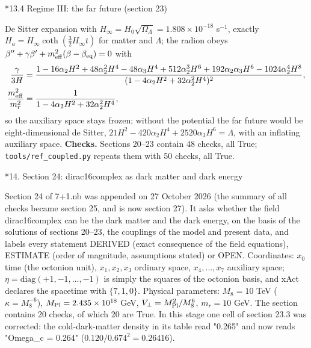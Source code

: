 \documentclass[10pt,a4paper]{article}
\makeatletter
\renewcommand\section{\@startsection{section}{1}{\z@}{-3.5ex \@plus -1ex \@minus -.2ex}{2.3ex \@plus.2ex}{\normalfont\Large\bfseries\raggedright}}
\renewcommand\subsection{\@startsection{subsection}{2}{\z@}{-3.25ex\@plus -1ex \@minus -.2ex}{1.5ex \@plus .2ex}{\normalfont\large\bfseries\raggedright}}
\makeatother
\begin{document}
\subsection*{13.4 Regime III: the far future (section 23)}
De Sitter expansion with $H_\infty=H_0\sqrt{\Omega_\Lambda}=1.808\times10^{-18}$ s$^{-1}$, exactly $H_a=H_\infty\coth(\tfrac32H_\infty t)$ for matter and $\Lambda$; the radion obeys $\beta''+\gamma\beta'+m_{\rm eff}^2(\beta-\beta_{\rm eq})=0$ with
\begin{align*}
\frac{\gamma}{3H}&=\frac{1-16\alpha_2H^2+48\alpha_2^2H^4-48\alpha_3H^4+512\alpha_2^3H^6+192\alpha_2\alpha_3H^6-1024\alpha_2^4H^8}{(1-4\alpha_2H^2+32\alpha_2^2H^4)^2}, \\
\frac{m_{\rm eff}^2}{m_r^2}&=\frac1{1-4\alpha_2H^2+32\alpha_2^2H^4},
\end{align*}
so the auxiliary space stays frozen; without the potential the far future would be eight-dimensional de Sitter, $21H^2-420\alpha_2H^4+2520\alpha_3H^6=\Lambda$, with an inflating auxiliary space. \textbf{Checks.} Sections 20–23 contain 48 checks, all True; \texttt{tools/\allowbreak{}ref\_\allowbreak{}coupled.py} repeats them with 50 checks, all True.

\section*{14. Section 24: dirac16complex as dark matter and dark energy}
Section 24 of 7+1.nb was appended on 27 October 2026 (the summary of all checks became section 25, and is now section 27). It asks whether the field dirac16complex can be the dark matter and the dark energy, on the basis of the solutions of sections 20–23, the couplings of the model and present data, and labels every statement DERIVED (exact consequence of the field equations), ESTIMATE (order of magnitude, assumptions stated) or OPEN. Coordinates: $x_0$ time (the octonion unit), $x_1,x_2,x_3$ ordinary space, $x_4,\dots,x_7$ auxiliary space; $\eta=\mathrm{diag}(+1,-1,\dots,-1)$ is simply the squares of the octonion basis, and xAct declares the spacetime with $\{7,1,0\}$. Physical parameters: $M_8=10$ TeV ($\kappa=M_8^{-6}$), $M_{\rm Pl}=2.435\times10^{18}$ GeV, $V_\perp=M_{\rm Pl}^2/M_8^6$, $m_r=10$ GeV. The section contains 20 checks, of which 20 are True. In this stage one cell of section 23.3 was corrected: the cold-dark-matter density in its table read "0.265" and now reads "Omega\_c = 0.264" ($0.120/0.674^2=0.26416$).
\end{document}
